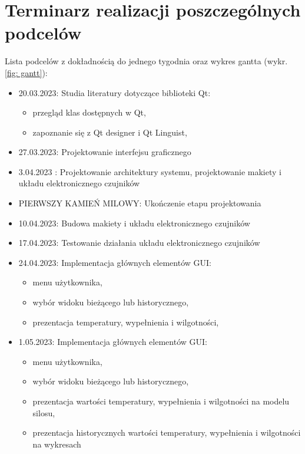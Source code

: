 \section{Terminarz realizacji poszczególnych podcelów}
    Lista podcelów z dokładnością do jednego tygodnia oraz wykres gantta (wykr. \ref{fig: gantt}):
\begin{itemize}
    \item 
        20.03.2023: Studia literatury dotyczące biblioteki Qt:
        \begin{itemize}
            \item przegląd klas dostępnych w Qt,
            \item zapoznanie się z Qt designer i Qt Linguist,
        \end{itemize} 
    \item 
        27.03.2023: Projektowanie interfejsu graficznego
    \item 
        3.04.2023 : Projektowanie architektury systemu, projektowanie makiety i układu elektronicznego czujników
        \item PIERWSZY KAMIEŃ MILOWY: Ukończenie etapu projektowania
    \item 
        10.04.2023: Budowa makiety i układu elektronicznego czujników
    \item 
        17.04.2023: Testowanie działania układu elektronicznego czujników
    \item 
        24.04.2023: Implementacja głównych elementów GUI:
        \begin{itemize}
            \item menu użytkownika,
            \item wybór widoku bieżącego lub historycznego,
            \item prezentacja temperatury, wypełnienia i wilgotności,
        \end{itemize}
    \item 
        1.05.2023: Implementacja głównych elementów GUI:
        \begin{itemize}
            \item menu użytkownika,
            \item wybór widoku bieżącego lub historycznego,
            \item prezentacja wartości temperatury, wypełnienia i wilgotności na modelu silosu,
            \item prezentacja historycznych wartości temperatury, wypełnienia i wilgotności na wykresach
        \end{itemize}

\end{itemize}

